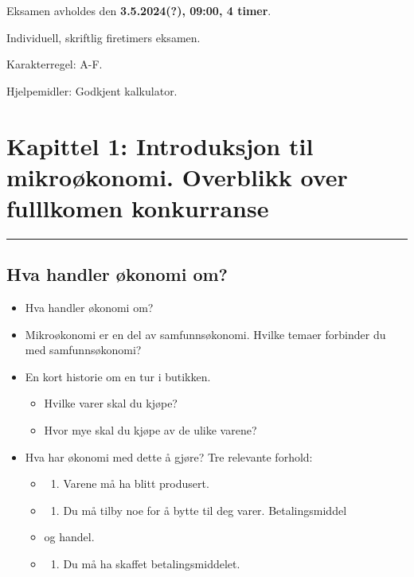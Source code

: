 \documentclass[
  letterpaper,
  DIV=11,
  numbers=noendperiod]{scrartcl}
\providecommand{\tightlist}{%
  \setlength{\itemsep}{0pt}\setlength{\parskip}{0pt}}\usepackage{longtable,booktabs,array}
\begin{document}
Eksamen avholdes den \textbf{3.5.2024(?), 09:00, 4 timer}.

Individuell, skriftlig firetimers eksamen.

Karakterregel: A-F.

Hjelpemidler: Godkjent kalkulator.

\section{Kapittel 1: Introduksjon til mikroøkonomi. Overblikk over
fulllkomen
konkurranse}\label{kapittel-1-introduksjon-til-mikrouxf8konomi.-overblikk-over-fulllkomen-konkurranse}

\begin{center}\rule{0.5\linewidth}{0.5pt}\end{center}

\subsection{Hva handler økonomi om?}\label{hva-handler-uxf8konomi-om}

\begin{itemize}
\tightlist
\item
  Hva handler økonomi om?
\item
  Mikroøkonomi er en del av samfunnsøkonomi. Hvilke temaer forbinder du
  med samfunnsøkonomi?
\item
  En kort historie om en tur i butikken.

  \begin{itemize}
  \tightlist
  \item
    Hvilke varer skal du kjøpe?
  \item
    Hvor mye skal du kjøpe av de ulike varene?
  \end{itemize}
\item
  Hva har økonomi med dette å gjøre? Tre relevante forhold:

  \begin{itemize}
  \tightlist
  \item
    \begin{enumerate}
    \def\labelenumi{(\roman{enumi})}
    \tightlist
    \item
      Varene må ha blitt produsert.
    \end{enumerate}
  \item
    \begin{enumerate}
    \def\labelenumi{(\roman{enumi})}
    \setcounter{enumi}{1}
    \tightlist
    \item
      Du må tilby noe for å bytte til deg varer. Betalingsmiddel
    \end{enumerate}
  \item
    og handel.
  \item
    \begin{enumerate}
    \def\labelenumi{(\roman{enumi})}
    \setcounter{enumi}{2}
    \tightlist
    \item
      Du må ha skaffet betalingsmiddelet.
    \end{enumerate}
  \end{itemize}
\end{itemize}
\end{document}

